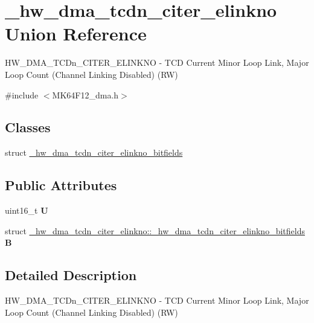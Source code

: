 \hypertarget{union__hw__dma__tcdn__citer__elinkno}{}\section{\+\_\+hw\+\_\+dma\+\_\+tcdn\+\_\+citer\+\_\+elinkno Union Reference}
\label{union__hw__dma__tcdn__citer__elinkno}


H\+W\+\_\+\+D\+M\+A\+\_\+\+T\+C\+Dn\+\_\+\+C\+I\+T\+E\+R\+\_\+\+E\+L\+I\+N\+K\+NO -\/ T\+CD Current Minor Loop Link, Major Loop Count (Channel Linking Disabled) (RW)  




{\ttfamily \#include $<$M\+K64\+F12\+\_\+dma.\+h$>$}

\subsection*{Classes}
\begin{DoxyCompactItemize}
\item 
struct \hyperlink{struct__hw__dma__tcdn__citer__elinkno_1_1__hw__dma__tcdn__citer__elinkno__bitfields}{\+\_\+hw\+\_\+dma\+\_\+tcdn\+\_\+citer\+\_\+elinkno\+\_\+bitfields}
\end{DoxyCompactItemize}
\subsection*{Public Attributes}
\begin{DoxyCompactItemize}
\item 
uint16\+\_\+t {\bfseries U}\hypertarget{union__hw__dma__tcdn__citer__elinkno_a3288f6b7c730f44058cccd93eb53bacf}{}\label{union__hw__dma__tcdn__citer__elinkno_a3288f6b7c730f44058cccd93eb53bacf}

\item 
struct \hyperlink{struct__hw__dma__tcdn__citer__elinkno_1_1__hw__dma__tcdn__citer__elinkno__bitfields}{\+\_\+hw\+\_\+dma\+\_\+tcdn\+\_\+citer\+\_\+elinkno\+::\+\_\+hw\+\_\+dma\+\_\+tcdn\+\_\+citer\+\_\+elinkno\+\_\+bitfields} {\bfseries B}\hypertarget{union__hw__dma__tcdn__citer__elinkno_a137de53095423917e83237d4a1314920}{}\label{union__hw__dma__tcdn__citer__elinkno_a137de53095423917e83237d4a1314920}

\end{DoxyCompactItemize}


\subsection{Detailed Description}
H\+W\+\_\+\+D\+M\+A\+\_\+\+T\+C\+Dn\+\_\+\+C\+I\+T\+E\+R\+\_\+\+E\+L\+I\+N\+K\+NO -\/ T\+CD Current Minor Loop Link, Major Loop Count (Channel Linking Disabled) (RW) 

